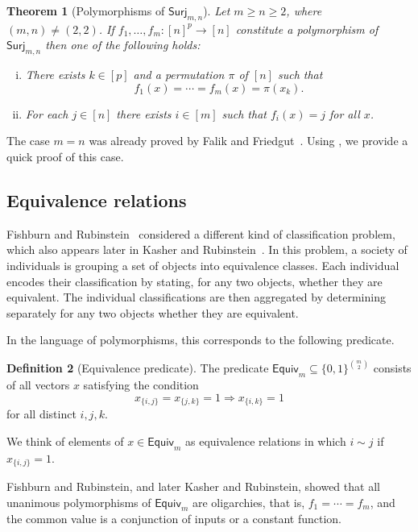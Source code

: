 \documentclass{article}
\providecommand{\Surj}{\mathsf{Surj}}
\providecommand{\Equiv}{\mathsf{Equiv}}
\newtheorem{theorem}{Theorem}[section]
\theoremstyle{definition}
\newtheorem{definition}[theorem]{Definition}
\theoremstyle{remark}
\begin{document}
\begin{theorem}[Polymorphisms of $\Surj_{m,n}$] \label{thm:surj-polymorphisms}
Let $m \ge n \ge 2$, where $(m,n) \neq (2,2)$. If $f_1,\dots,f_m\colon [n]^p \to [n]$ constitute a polymorphism of $\Surj_{m,n}$ then one of the following holds:
\begin{enumerate}[(i)]
\item \label{itm:surj-dictator}
There exists $k \in [p]$ and a permutation $\pi$ of $[n]$ such that
\[
 f_1(x) = \cdots = f_m(x) = \pi(x_k).
\]
\item For each $j \in [n]$ there exists $i \in [m]$ such that $f_i(x) = j$ for all $x$.
\label{itm:surj-constant}
\end{enumerate}
\end{theorem}

The case $m = n$ was already proved by Falik and Friedgut~\cite{FalikFriedgut}. Using , we provide a quick proof of this case.

\subsection{Equivalence relations}
\label{sec:intro-equivalence}

Fishburn and Rubinstein~\cite{FishburnRubinstein} considered a different kind of classification problem, which also appears later in Kasher and Rubinstein~\cite{KasherRubinstein}. In this problem, a society of individuals is grouping a set of objects into equivalence classes. Each individual encodes their classification by stating, for any two objects, whether they are equivalent. The individual classifications are then aggregated by determining separately for any two objects whether they are equivalent.

In the language of polymorphisms, this corresponds to the following predicate.

\begin{definition}[Equivalence predicate]
\label{def:equivalence}
The predicate $\Equiv_m \subseteq \{0,1\}^{\binom{m}{2}}$ consists of all vectors $x$ satisfying the condition
\[
 x_{\{i,j\}} = x_{\{j,k\}} = 1 \Longrightarrow x_{\{i,k\}} = 1
\]
for all distinct $i,j,k$.
\end{definition}

We think of elements of $x \in \Equiv_m$ as equivalence relations in which $i \sim j$ if $x_{\{i,j\}} = 1$.

Fishburn and Rubinstein, and later Kasher and Rubinstein, showed that all unanimous polymorphisms of $\Equiv_m$ are oligarchies, that is, $f_1 = \cdots = f_m$, and the common value is a conjunction of inputs or a constant function.
\end{document}
